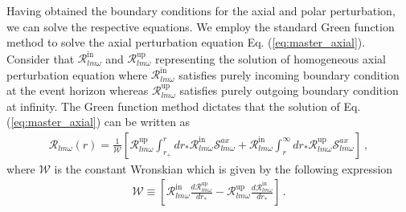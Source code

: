 \documentclass[11pt]{article}
\def\In{\textrm{in}}
\def\up{\textrm{up}}
\newcommand{\ca}[1]{\mathcal{#1}}
\begin{document}
Having obtained the boundary conditions for the axial and polar perturbation, we can solve the respective equations. We employ the standard Green function method to solve the axial perturbation equation Eq. (\ref{eq:master_axial}). Consider that $\ca{R}_{lm\omega}^{\In}$ and $\ca{R}_{lm\omega}^{\up}$ representing the solution of homogeneous axial perturbation equation where $\ca{R}_{lm\omega}^{\In}$ satisfies purely incoming boundary condition at the event horizon whereas $\ca{R}_{lm\omega}^{\up}$ satisfies purely outgoing boundary condition at infinity. The Green function method dictates that the solution of Eq. (\ref{eq:master_axial}) can be written as 
\begin{equation}\label{axial_sol}
\begin{aligned}
\ca{R}_{lm\omega}(r)=\frac{1}{\ca{W}}\left[\ca{R}_{lm\omega}^{\up}\int_{r_+}^{r}dr_{*}\ca{R}_{lm\omega}^{\In} \ca{S}_{lm\omega}^{ax}+\ca{R}_{lm\omega}^{\In}\int_{r}^{\infty}dr_{*}\ca{R}_{lm\omega}^{\up} \ca{S}_{lm\omega}^{ax}\right]~,
\end{aligned}
\end{equation}
where $\ca{W}$ is the constant Wronskian which is given by the following expression
\begin{equation}\label{Wronskian}
\begin{aligned}
\ca{W}\equiv \left[\ca{R}_{lm\omega}^{\In}\frac{d\ca{R}_{lm\omega}^{\up}}{dr_*}-\ca{R}_{lm\omega}^{\up}\frac{d\ca{R}_{lm\omega}^{\In}}{dr_*}\right]\,.
\end{aligned}
\end{equation}
\end{document}

